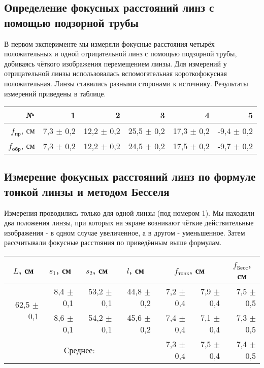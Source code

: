 \subsection*{Определение фокусных расстояний линз с помощью подзорной трубы}
В первом эксперименте мы измеряли фокусные расстояния четырёх положительных и одной отрицательной линз с помощью подзорной трубы, добиваясь чёткого изображения перемещением линзы. Для измерений у отрицательной линзы использовалась вспомогательная короткофокусная положительная. Линзы ставились разными сторонами к источнику. Результаты измерений приведены в таблице.

\begin{table}[H]
\centering
\begin{tabular}{|r|r|r|r|r|r|}
\hline
№     & 1   & 2    & 3    & 4    & 5    \\ \hline \hline
$f_\text{пр}$, см & 7,3 $\pm$ 0,2 & 12,2 $\pm$ 0,2 & 25,5 $\pm$ 0,2  & 17,3 $\pm$ 0,2 & -9,4 $\pm$ 0,2 \\ \hline
$f_\text{обр}$, см & 7,3 $\pm$ 0,2 & 12,2 $\pm$ 0,2 & 24,5 $\pm$ 0,2 & 17,5 $\pm$ 0,2 & -9,7 $\pm$ 0,2 \\ \hline
\end{tabular}
\end{table}

\subsection*{Измерение фокусных расстояний линз по формуле тонкой линзы и
методом Бесселя}
Измерения проводились только для одной линзы (под номером 1). Мы находили два положения линзы, при которых на экране возникают чёткие действительные изображения - в одном случае увеличенное, а в другом - уменьшенное. Затем рассчитывали фокусные расстояния по приведённым выше формулам.

\begin{table}[H]
\centering
\begin{tabular}{|rrrr|rr|r|}
\hline
\multicolumn{1}{|c|}{$L$, см} &
  \multicolumn{1}{c|}{$s_1$, см} &
  \multicolumn{1}{c|}{$s_2$, см} &
  \multicolumn{1}{c|}{$l$, см} &
  \multicolumn{2}{c|}{$f_{\text{тонк}}$, см} &
  \multicolumn{1}{c|}{$f_{\text{Бесс}}$, см} \\ \hline \hline
\multicolumn{1}{|r|}{\multirow{2}{*}{62,5 $\pm$ 0,1}} &
  \multicolumn{1}{r|}{8,4 $\pm$ 0,1} &
  \multicolumn{1}{r|}{53,2 $\pm$ 0,1} &
  44,8 $\pm$ 0,2 &
  \multicolumn{1}{r|}{7,2 $\pm$ 0,4} &
  7,9 $\pm$ 0,4 &
  7,5 $\pm$ 0,5 \\ \cline{2-7} 
\multicolumn{1}{|r|}{} &
  \multicolumn{1}{r|}{8,6 $\pm$ 0,1} &
  \multicolumn{1}{r|}{54,2 $\pm$ 0,1} &
  45,6 $\pm$ 0,2 &
  \multicolumn{1}{r|}{7,4 $\pm$ 0,4} &
  7,1 $\pm$ 0,4 &
  7,3 $\pm$ 0,5 \\ \hline \hline
\multicolumn{4}{|c|}{Среднее:} & \multicolumn{1}{r|}{7,3 $\pm$ 0,4} & 7,5 $\pm$ 0,4 & 7,4 $\pm$ 0,5 \\ \hline
\end{tabular}
\end{table}

